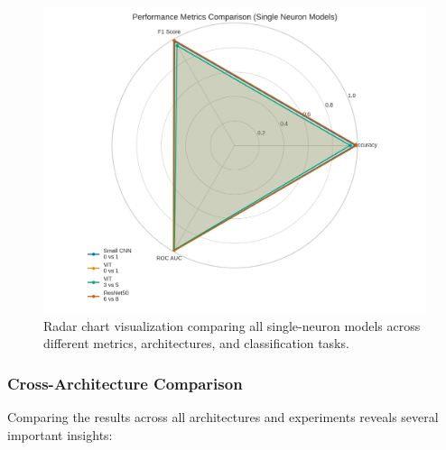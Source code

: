 \documentclass[11pt]{article}
\begin{document}
\begin{figure}[htbp]
\centering
\includegraphics[width=\textwidth]{figures/radar_chart_comparison.png}
\caption{Radar chart visualization comparing all single-neuron models across different metrics, architectures, and classification tasks.}
\end{figure}

\subsubsection{Cross-Architecture Comparison}
Comparing the results across all architectures and experiments reveals several important insights:
\end{document}
